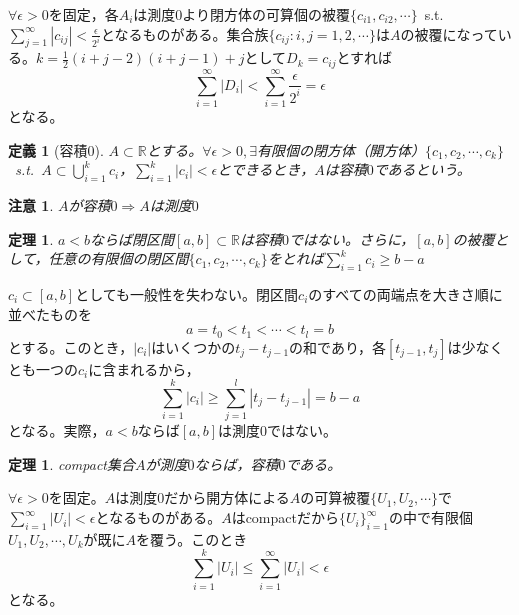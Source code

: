 \documentclass[dvipdfmx,a4j,10pt]{jsarticle}
\makeatletter
\theoremstyle{mystyle1}
\newtheorem{thm}[dfn]{定理}
\theoremstyle{mystyle2}
\newtheorem{dfn*}{定義}
\newtheorem{note}{注意}
\renewenvironment{proof}[1][\proofname]{\par
  \pushQED{\qed}%
  \normalfont
  \topsep6\p@\@plus6\p@ \trivlist
  \item[\hskip\labelsep{\bfseries\sffamily #1}]\ignorespaces
}{%
  \popQED\endtrivlist\@endpefalse
}
\renewcommand\proofname{証明}
\makeatother
\begin{document}
\begin{proof}
	$\forall\epsilon>0$を固定，各$A_i$は測度$0$より閉方体の可算個の被覆$\{c_{i1},c_{i2},\cdots\}$\ {\rm s.t.}\ $\displaystyle\sum_{j=1}^\infty|c_{ij}|<\frac{\epsilon}{2^i}$となるものがある。集合族$\{c_{ij}:i,j=1,2,\cdots\}$は$A$の被覆になっている。$\displaystyle k=\frac{1}{2}(i+j-2)(i+j-1)+j$として$D_k=c_{ij}$とすれば
	\[
		\sum_{i=1}^\infty|D_i|<\sum_{i=1}^\infty\frac{\epsilon}{2^i}=\epsilon
	\]
	となる。
\end{proof}

\newpage

\begin{dfn*}[容積0]
	$A\subset\mathbb{R}$とする。$\forall\epsilon>0,\exists$有限個の閉方体（開方体）$\{c_1,c_2,\cdots,c_k\}$\ s.t.\ $A\displaystyle\subset\bigcup_{i=1}^kc_i$，$\displaystyle\sum_{i=1}^k|c_i|<\epsilon$とできるとき，$A$は容積$0$であるという。
\end{dfn*}

\begin{note}
	$A$が容積$0\Rightarrow A$は測度$0$
\end{note}

\begin{framed}
	\begin{thm}\label{th3.5}
		$a<b$ならば閉区間$[a,b]\subset\mathbb{R}$は容積$0$ではない。さらに，$[a,b]$の被覆として，任意の有限個の閉区間$\{c_1,c_2,\cdots,c_k\}$をとれば$\sum_{i=1}^k c_i\geq b-a$
	\end{thm}
\end{framed}

\begin{proof}
	$c_i\subset [a,b]$としても一般性を失わない。閉区間$c_i$のすべての両端点を大きさ順に並べたものを
	\[
		a=t_0<t_1<\cdots<t_l=b
	\]
	とする。このとき，$|c_i|$はいくつかの$t_j-t_{j-1}$の和であり，各$[t_{j-1},t_j]$は少なくとも一つの$c_i$に含まれるから，
	\[
		\sum_{i=1}^k|c_i|\geq \sum_{j=1}^l|t_j-t_{j-1}|=b-a
	\]
	となる。実際，$a<b$ならば$[a,b]$は測度$0$ではない。
\end{proof}

\begin{framed}
	\begin{thm}\label{th3.6}
		compact集合$A$が測度$0$ならば，容積$0$である。
	\end{thm}
\end{framed}

\begin{proof}
	$\forall\epsilon>0$を固定。$A$は測度$0$だから開方体による$A$の可算被覆$\{U_1,U_2,\cdots\}$で$\displaystyle\sum_{i=1}^\infty|U_i|<\epsilon$となるものがある。$A$はcompactだから$\{U_i\}_{i=1}^\infty$の中で有限個$U_1,U_2,\cdots,U_k$が既に$A$を覆う。このとき
	\[
		\sum_{i=1}^k|U_i|\leq\sum_{i=1}^\infty|U_i|<\epsilon
	\]
	となる。
\end{proof}
\end{document}
